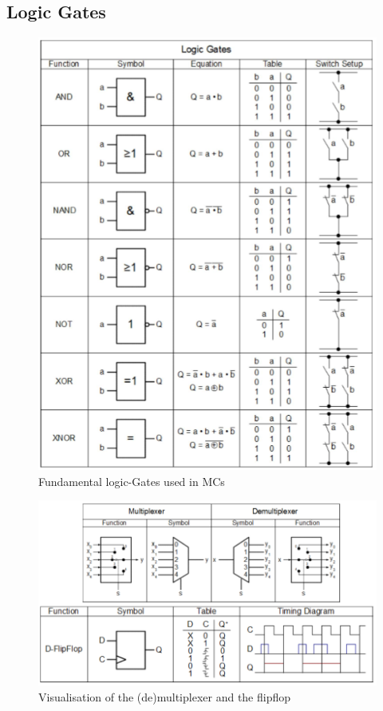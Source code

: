 \documentclass[a4paper, 11pt, nofootinbib]{article}
\begin{document}
\subsection{Logic Gates}
\begin{figure}[htb]
	\centering
	\includegraphics[keepaspectratio=true,height=25\baselineskip]{logicGates.PNG}
	\caption{Fundamental logic-Gates used in MCs}
	\label{fig:logicGates}
\end{figure}

\begin{figure}[htb]
	\centering
	\includegraphics[keepaspectratio=true,height=15\baselineskip]{flipflop.PNG}
	\caption{Visualisation of the (de)multiplexer and the flipflop}
	\label{fig:multFlip}
\end{figure}
\end{document}
